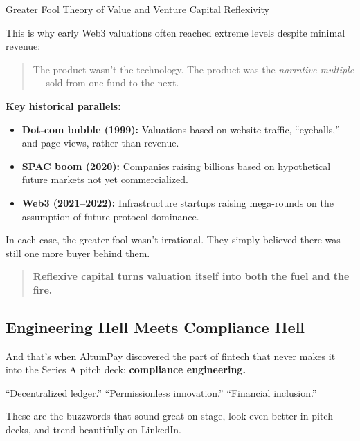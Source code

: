 \begin{HistoricalSidebar}{Greater Fool Theory of Value and Venture Capital Reflexivity}
    \medskip
    
    This is why early Web3 valuations often reached extreme levels despite minimal revenue:
    
    \begin{quote}
    The product wasn’t the technology.  
    The product was the \emph{narrative multiple} --- sold from one fund to the next.
    \end{quote}
    
    \medskip
    
    \textbf{Key historical parallels:}
    
    \begin{itemize}
        \item \textbf{Dot-com bubble (1999):} Valuations based on website traffic, ``eyeballs,'' and page views, rather than revenue.
        \item \textbf{SPAC boom (2020):} Companies raising billions based on hypothetical future markets not yet commercialized.
        \item \textbf{Web3 (2021--2022):} Infrastructure startups raising mega-rounds on the assumption of future protocol dominance.
    \end{itemize}
    
    \medskip
    
    In each case, the greater fool wasn’t irrational.  
    They simply believed there was still one more buyer behind them.
    
    \begin{quote}
    \textbf{Reflexive capital turns valuation itself into both the fuel and the fire.}
    \end{quote}
    
\end{HistoricalSidebar}




\subsection{Engineering Hell Meets Compliance Hell}

And that’s when AltumPay discovered the part of fintech that never makes it into the Series A pitch deck:  
\textbf{compliance engineering.}

“Decentralized ledger.”  
“Permissionless innovation.”  
“Financial inclusion.”  

These are the buzzwords that sound great on stage, look even better in pitch decks, and trend beautifully on LinkedIn.

